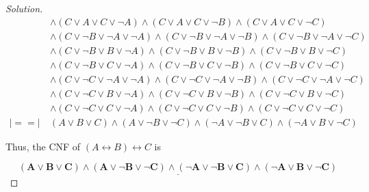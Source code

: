 \documentclass{article}
\newenvironment{solution}{\begin{proof}[\noindent\it Solution]}{\end{proof}}
\begin{document}
\begin{solution}
\begin{align*}
        & \land\left(C\lor A\lor C\lor\neg A\right)\land\left(C\lor A\lor C\lor\neg B\right)\land\left(C\lor A\lor C\lor\neg C\right) \\
        & \land\left(C\lor\neg B\lor\neg A\lor\neg A\right)\land\left(C\lor\neg B\lor\neg A\lor\neg B\right)\land\left(C\lor\neg B\lor\neg A\lor\neg C\right) \\
        & \land\left(C\lor\neg B\lor B\lor\neg A\right)\land\left(C\lor\neg B\lor B\lor\neg B\right)\land\left(C\lor\neg B\lor B\lor\neg C\right) \\
        & \land\left(C\lor\neg B\lor C\lor\neg A\right)\land\left(C\lor\neg B\lor C\lor\neg B\right)\land\left(C\lor\neg B\lor C\lor\neg C\right) \\
        & \land\left(C\lor\neg C\lor\neg A\lor\neg A\right)\land\left(C\lor\neg C\lor\neg A\lor\neg B\right)\land\left(C\lor\neg C\lor\neg A\lor\neg C\right) \\
        & \land\left(C\lor\neg C\lor B\lor\neg A\right)\land\left(C\lor\neg C\lor B\lor\neg B\right)\land\left(C\lor\neg C\lor B\lor\neg C\right) \\
        & \land\left(C\lor\neg C\lor C\lor\neg A\right)\land\left(C\lor\neg C\lor C\lor\neg B\right)\land\left(C\lor\neg C\lor C\lor\neg C\right) \\
        |\!\!\!==\!\!\!|\ &\left(A\lor B\lor C\right)\land\left(A\lor\neg B\lor\neg C\right)\land\left(\neg A\lor\neg B\lor C\right)\land\left(\neg A\lor B\lor\neg C\right)
    \end{align*}

    Thus, the CNF of $\left(A\leftrightarrow B\right)\leftrightarrow C$ is 
    
    \vspace{-1.5em}
    $$\underline{\boldsymbol{\left(A\lor B\lor C\right)\land\left(A\lor\neg B\lor\neg C\right)\land\left(\neg A\lor\neg B\lor C\right)\land\left(\neg A\lor B\lor\neg C\right)}}$$

    \vspace{-2.7em}
\end{solution}

\vspace{1em}
\end{document}
